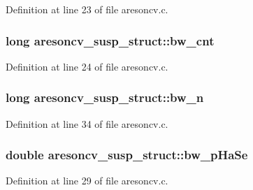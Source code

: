 Definition at line 23 of file aresoncv.\+c.

\subsubsection[{\texorpdfstring{bw\+\_\+cnt}{bw_cnt}}]{\setlength{\rightskip}{0pt plus 5cm}long aresoncv\+\_\+susp\+\_\+struct\+::bw\+\_\+cnt}\hypertarget{structaresoncv__susp__struct_a3a6b2d7744c76c65894742458ddb7455}{}\label{structaresoncv__susp__struct_a3a6b2d7744c76c65894742458ddb7455}


Definition at line 24 of file aresoncv.\+c.

\subsubsection[{\texorpdfstring{bw\+\_\+n}{bw_n}}]{\setlength{\rightskip}{0pt plus 5cm}long aresoncv\+\_\+susp\+\_\+struct\+::bw\+\_\+n}\hypertarget{structaresoncv__susp__struct_a91496ab2df06e905d88abcdc46597906}{}\label{structaresoncv__susp__struct_a91496ab2df06e905d88abcdc46597906}


Definition at line 34 of file aresoncv.\+c.

\subsubsection[{\texorpdfstring{bw\+\_\+p\+Ha\+Se}{bw_pHaSe}}]{\setlength{\rightskip}{0pt plus 5cm}double aresoncv\+\_\+susp\+\_\+struct\+::bw\+\_\+p\+Ha\+Se}\hypertarget{structaresoncv__susp__struct_aeea5b2e37e18ddc8f967325ca33c3064}{}\label{structaresoncv__susp__struct_aeea5b2e37e18ddc8f967325ca33c3064}


Definition at line 29 of file aresoncv.\+c.

